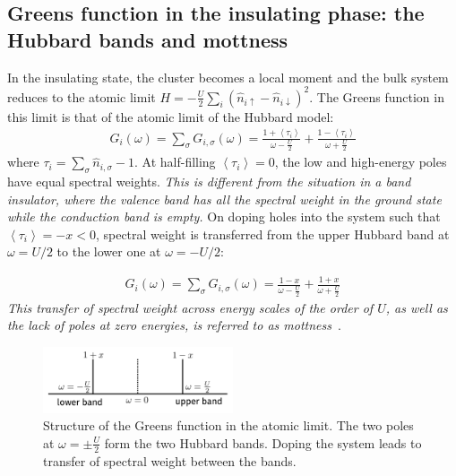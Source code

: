 \documentclass[reprint,hidelinks]{revtex4-2}
\begin{document}
\begin{widetext}
\section{Greens function in the insulating phase: the Hubbard bands and mottness}
In the insulating state, the cluster becomes a local moment and the bulk system reduces to the atomic limit \(H = -\frac{U}{2}\sum_i\left(\hat n_{i \uparrow} - \hat n_{i \downarrow}\right)^2\). The Greens function in this limit is that of the atomic limit of the Hubbard model:
\begin{equation}\begin{aligned}
	G_{i}(\omega) = \sum_\sigma G_{i,\sigma}(\omega) = \frac{1 + \left<\tau_{i }\right>}{\omega - \frac{U}{2}} + \frac{1 - \left<\tau_{i}\right>}{\omega + \frac{U}{2}}
\end{aligned}\end{equation}
where \(\tau_i = \sum_\sigma \hat n_{i,\sigma} - 1\). At half-filling \(\left<\tau_{i}\right>=0\), the low and high-energy poles have equal spectral weights. \textit{This is different from the situation in a band insulator, where the valence band has all the spectral weight in the ground state while the conduction band is empty.} On doping holes into the system such that \(\left<\tau_{i}\right> = -x < 0\), spectral weight is transferred from the upper Hubbard band at \(\omega = U/2\) to the lower one at \(\omega = -U/2\):

\begin{equation}\begin{aligned}
	G_{i}(\omega) = \sum_\sigma G_{i,\sigma}(\omega) = \frac{1 - x}{\omega - \frac{U}{2}} + \frac{1 + x}{\omega + \frac{U}{2}}
\end{aligned}\end{equation}
\textit{This transfer of spectral weight across energy scales of the order of \(U\), as well as the lack of poles at zero energies, is referred to as mottness}~\cite{phillips2006mottness}.
\begin{figure}[!htb]
	\centering
	\includegraphics[width=0.5\textwidth]{hubbard_bands.pdf}
	\caption{Structure of the Greens function in the atomic limit. The two poles at \(\omega = \pm \frac{U}{2}\) form the two Hubbard bands. Doping the system leads to transfer of spectral weight between the bands.}
\end{figure}


\end{widetext}
\end{document}
